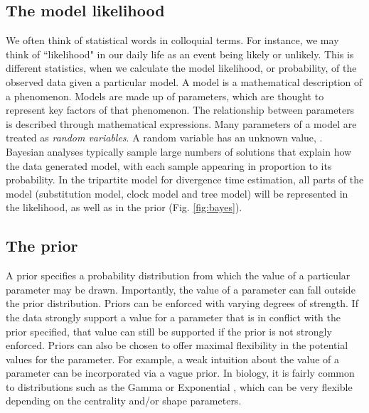 \subsection{The model likelihood}

We often think of statistical words in colloquial terms.
For instance, we may think of ``likelihood" in our daily life as an event being likely or unlikely.
This is different  statistics, when we calculate the model likelihood, or probability, of the observed data given a particular model.
A model is a mathematical description of a phenomenon.
Models are made up of parameters, which are thought to represent key factors of that phenomenon.
The relationship between parameters is described through mathematical expressions.
Many parameters of a model are treated as \textit{random variables}.
A random variable has an unknown value, .
Bayesian analyses typically sample large numbers of solutions that explain how the data  generated  model, with each sample appearing in proportion to its probability.
In the tripartite model for divergence time estimation, all parts of the model (substitution model, clock model and tree model) will be represented in the likelihood, as well as in the prior (Fig. \ref{fig:bayes}).


\subsection{The prior}


A prior specifies a probability distribution from which the value of a particular parameter may be drawn.
Importantly, the value of a parameter can fall outside the prior distribution.
Priors can be enforced with varying degrees of strength.
If the data strongly support a value for a parameter that is in conflict with the prior specified, that value can still be supported if the prior is not strongly enforced.
Priors can also be chosen to offer maximal flexibility in the potential values for the parameter.
For example, a weak intuition about the value of a parameter can be incorporated via a vague prior.
In biology, it is fairly common to  distributions such as the Gamma or Exponential , which can be very flexible depending on the centrality and/or shape parameters.

